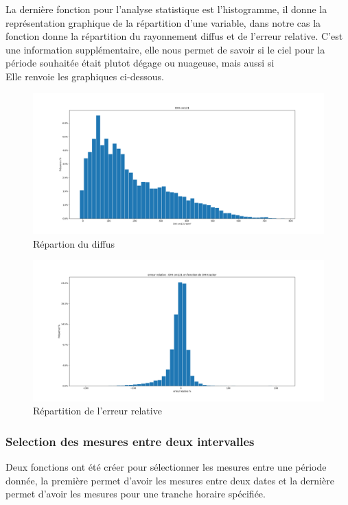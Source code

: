 \documentclass[12pt,a4paper]{article}
\begin{document}
\begin{flushleft}
La dernière fonction pour l'analyse statistique est l'histogramme, il donne la représentation graphique de la répartition d'une variable, dans notre cas la fonction donne la répartition du rayonnement diffus et de l'erreur relative. C'est une information supplémentaire, elle nous permet de savoir si le ciel pour la période souhaitée était plutot dégage ou nuageuse, mais aussi si \\
Elle renvoie les graphiques ci-dessous.
\begin{figure}[H]
\centering
\includegraphics[width=15cm]{image/histogramme/1.png} 
\caption{Répartion du diffus}  
\end{figure}

\begin{figure}[H]
\centering
\includegraphics[width=15cm]{image/histogramme/2.png}  
\caption{Répartition de l'erreur relative}  
\end{figure}


\subsubsection{Selection des mesures entre deux intervalles}

Deux fonctions ont été créer pour sélectionner les mesures entre une période donnée, la première permet d'avoir les mesures entre deux dates et la dernière permet d'avoir les mesures pour une tranche horaire spécifiée.


\end{flushleft}
\end{document}

